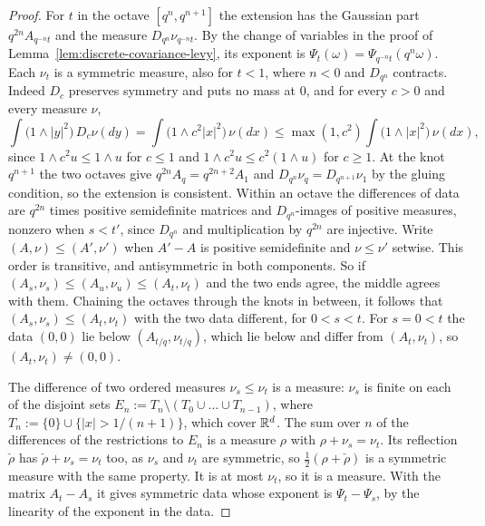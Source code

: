 \begin{proof}
\leanok
{}
For $t$ in the octave $[q^n, q^{n+1}]$ the extension has the Gaussian part $q^{2n}A_{q^{-n}t}$ and
the \Levy{} measure $D_{q^n}\nu_{q^{-n}t}$. By the change of variables in the proof of
Lemma~\ref{lem:discrete-covariance-levy}, its exponent is
$\Psi_t(\omega) = \Psi_{q^{-n}t}(q^n\omega)$. Each $\nu_t$ is a symmetric \Levy{} measure, also for
$t < 1$, where $n < 0$ and $D_{q^n}$ contracts. Indeed $D_c$ preserves symmetry and puts no mass at
$0$, and for every $c > 0$ and every \Levy{} measure $\nu$,
\[
  \int\bigl(1 \wedge |y|^2\bigr)\,D_c\nu(dy) = \int\bigl(1 \wedge c^2|x|^2\bigr)\,\nu(dx)
  \le \max(1, c^2)\int\bigl(1 \wedge |x|^2\bigr)\,\nu(dx),
\]
since $1 \wedge c^2u \le 1 \wedge u$ for $c \le 1$ and $1 \wedge c^2u \le c^2(1 \wedge u)$ for
$c \ge 1$. At the knot $q^{n+1}$ the two octaves give
$q^{2n}A_q = q^{2n+2}A_1$ and $D_{q^n}\nu_q = D_{q^{n+1}}\nu_1$ by the gluing condition, so the
extension is consistent. Within an octave the differences of data are $q^{2n}$ times positive
semidefinite matrices and $D_{q^n}$-images of positive measures, nonzero when $s < t'$, since
$D_{q^n}$ and multiplication by $q^{2n}$ are injective. Write $(A, \nu) \le (A', \nu')$ when
$A' - A$ is positive semidefinite and $\nu \le \nu'$ setwise. This order is transitive, and
antisymmetric in both components. So if $(A_s, \nu_s) \le (A_u, \nu_u) \le (A_t, \nu_t)$ and the
two ends agree, the middle agrees with them. Chaining the octaves through the knots in between,
it follows that $(A_s, \nu_s) \le (A_t, \nu_t)$ with the two data different, for $0 < s < t$. For
$s = 0 < t$ the data $(0, 0)$ lie below $(A_{t/q}, \nu_{t/q})$, which lie below and differ from
$(A_t, \nu_t)$, so $(A_t, \nu_t) \ne (0, 0)$.

The difference of two ordered \Levy{} measures $\nu_s \le \nu_t$ is a measure: $\nu_s$ is finite
on each of the disjoint sets $E_n := T_n \setminus (T_0 \cup \dots \cup T_{n-1})$, where
$T_n := \{0\} \cup \{|x| > 1/(n+1)\}$, which cover $\mathbb{R}^d$. The sum over $n$ of the differences of
the restrictions to $E_n$ is a measure $\rho$ with $\rho + \nu_s = \nu_t$. Its reflection
$\check\rho$ has $\check\rho + \nu_s = \nu_t$ too, as $\nu_s$ and $\nu_t$ are symmetric, so
$\tfrac12(\rho + \check\rho)$ is a symmetric measure with the same property. It is at most
$\nu_t$, so it is a \Levy{} measure. With the matrix $A_t - A_s$ it gives symmetric data whose
exponent is $\Psi_t - \Psi_s$, by the linearity of the exponent in the data.


\end{proof}
